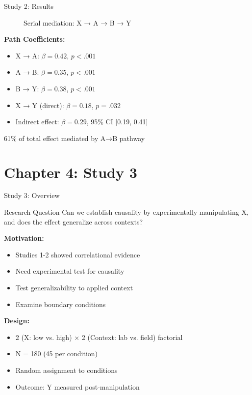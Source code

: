 \documentclass[aspectratio=169,12pt]{beamer}
\begin{document}
\begin{frame}{Study 2: Results}
  \begin{figure}
    \centering
    \caption{Serial mediation: X → A → B → Y}
  \end{figure}
  
  \vspace{0.5cm}
  
  \textbf{Path Coefficients:}
  \begin{itemize}
    \item X → A: $\beta = 0.42$, $p < .001$
    \item A → B: $\beta = 0.35$, $p < .001$
    \item B → Y: $\beta = 0.38$, $p < .001$
    \item X → Y (direct): $\beta = 0.18$, $p = .032$
    \item Indirect effect: $\beta = 0.29$, 95\% CI [0.19, 0.41]
  \end{itemize}
  
  \alert{61\% of total effect mediated by A→B pathway}
\end{frame}


\section{Chapter 4: Study 3}

\begin{frame}{Study 3: Overview}
  \begin{alertblock}{Research Question}
    Can we establish causality by experimentally manipulating X, and does the effect generalize across contexts?
  \end{alertblock}
  
  \vspace{0.5cm}
  
  \textbf{Motivation:}
  \begin{itemize}
    \item Studies 1-2 showed correlational evidence
    \item Need experimental test for causality
    \item Test generalizability to applied context
    \item Examine boundary conditions
  \end{itemize}
  
  \vspace{0.5cm}
  
  \textbf{Design:}
  \begin{itemize}
    \item 2 (X: low vs. high) × 2 (Context: lab vs. field) factorial
    \item N = 180 (45 per condition)
    \item Random assignment to conditions
    \item Outcome: Y measured post-manipulation
  \end{itemize}
\end{frame}
\end{document}
